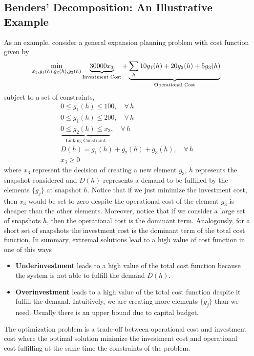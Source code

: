 \subsection{Benders' Decomposition: An Illustrative Example}
As an example, consider a general expansion planning problem with cost function given by
\begin{equation}
    \min_{x_{3},g_{1}(h),g_{2}(h),g_{3}(h)}\underbrace{30000x_{3}}_{\text{Investment Cost}} + \underbrace{\sum_{h}10g_{1}(h)+20g_{2}(h) + 5g_{3}(h)}_{\text{Operational Cost}}\\ 
\end{equation}
subject to a set of constraints,
\begin{align}
    0 \leq g_{1}(h) \leq 100, \quad \forall\,h\\
    0 \leq g_{1}(h) \leq 200, \quad \forall\,h\\
    \underbrace{0 \leq g_{2}(h) \leq x_{3}}_{\text{Linking Constraint}}, \quad \forall\,h \\
    D(h) = g_{1}(h) + g_{2}(h) + g_{3}(h), \quad \forall\,h \\
    x_{3} \geq 0
\end{align}
where $x_{3}$ represent the decision of creating a new element $g_{3}$, $h$ represents the snapshot considered and $D(h)$ represents a demand to be fulfilled by the elements $\{g_{j}\}$ at snapshot $h$. Notice that if we just minimize the investment cost, then $x_{3}$ would be set to zero despite the operational cost of the element $g_{3}$ is cheaper than the other elements. Moreover, notice that if we consider a large set of snapshots $h$, then the operational cost is the dominant term. Analogously, for a short set of snapshots the investment cost is the dominant term of the total cost function. In summary, extremal solutions lead to a high value of cost function in one of this ways
\begin{itemize}
    \item \textbf{Underinvestment} leads to a high value of the total cost function because the system is not able to fulfill the demand $D(h)$.
    \item \textbf{Overinvestment} leads to a high value of the total cost function despite it fulfill the demand. Intuitively, we are creating more elements $\{g_{j}\}$ than we need. Usually there is an upper bound due to capital budget.
\end{itemize}
The optimization problem is a trade-off between operational cost and investment cost where the optimal solution minimize the investment cost and operational cost fulfilling at the same time the constraints of the problem.
